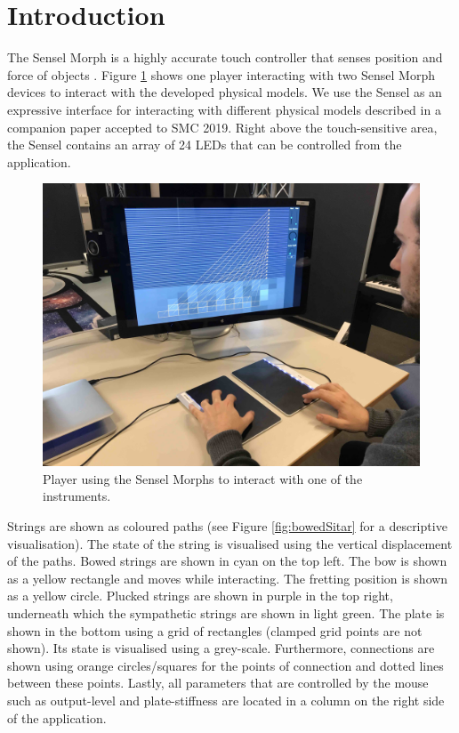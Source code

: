 \documentclass{article}
\title{\papertitle}
\begin{document}
%
\capstartfalse
\maketitle
\capstarttrue
%
\begin{abstract}
In this demonstration we present novel physical models controlled by the Sensel Morph interface.
\end{abstract}
%

\section{Introduction}\label{sec:introduction}
The Sensel Morph is a highly accurate touch controller that senses position and force of objects \cite{sensel2018}.  Figure \ref{fig:sensel} shows one player interacting with two Sensel Morph devices to interact with the developed physical models.
We use the Sensel as an expressive interface for interacting with different physical models described in a companion paper accepted to SMC 2019. Right above the touch-sensitive area, the Sensel contains an array of 24 LEDs that can be controlled from the application.
\begin{figure}[h]\includegraphics[width=1.0\columnwidth]{senselLQ.jpg}\centering
\caption{Player using the Sensel Morphs to interact with one of the instruments.\label{fig:sensel}}
\end{figure}

Strings are shown as coloured paths (see Figure \ref{fig:bowedSitar} for a descriptive visualisation). The state of the string is visualised using the vertical displacement of the paths. Bowed strings are shown in cyan on the top left. The bow is shown as a yellow rectangle and moves while interacting.
The fretting position is shown as a yellow circle. Plucked strings are shown in purple in the top right, underneath which the sympathetic strings are shown in light green. The plate is shown in the bottom using a grid of rectangles (clamped grid points are not shown). Its state is visualised using a grey-scale. Furthermore, connections are shown using orange circles/squares for the points of connection and dotted lines between these points. Lastly, all parameters that are controlled by the mouse such as output-level and plate-stiffness are located in a column on the right side of the application.
\end{document}
